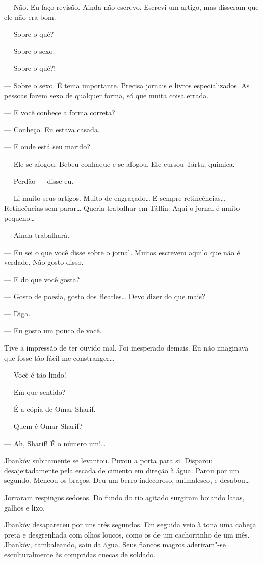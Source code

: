 --- Não. Eu faço revisão. Ainda não escrevo. Escrevi um artigo,
mas disseram que ele não era bom.

--- Sobre o quê?

--- Sobre o sexo.

--- Sobre o quê?!

--- Sobre o sexo. É tema importante. Precisa jornais e livros
especializados. As pessoas fazem sexo de qualquer forma, só que muita
coisa errada.

--- E você conhece a forma correta?

--- Conheço. Eu estava casada.

--- E onde está seu marido?

--- Ele se afogou. Bebeu conhaque e se afogou. Ele cursou Tártu,
química.

--- Perdão --- disse eu.

--- Li muito seus artigos. Muito de engraçado\ldots{} E sempre
retincências\ldots{} Retincências sem parar\ldots{} Queria trabalhar em
Tállin. Aqui o jornal é muito pequeno\ldots{}

--- Ainda trabalhará.

--- Eu sei o que você disse sobre o jornal. Muitos escrevem
aquilo que não é verdade. Não gosto disso.

--- E do que você gosta?

--- Gosto de poesia, gosto dos Beatles\ldots{} Devo dizer do que mais?

--- Diga.

--- Eu gosto um pouco de você.

Tive a impressão de ter ouvido mal. Foi inesperado demais. Eu não
imaginava que fosse tão fácil me constranger\ldots{}

--- Você é tão lindo!

--- Em que sentido?

--- É a cópia de Omar Sharif.

--- Quem é Omar Sharif?

--- Ah, Sharif! É o número um!\ldots{}

Jbankóv subitamente se levantou. Puxou a porta para si. Disparou
desajeitadamente pela escada de cimento em direção à água. Parou por um
segundo. Meneou os braços. Deu um berro indecoroso, animalesco, e
desabou\ldots{}

Jorraram respingos sedosos. Do fundo do rio agitado surgiram boiando
latas, galhos e lixo.

Jbankóv desapareceu por uns três segundos. Em seguida veio à tona uma
cabeça preta e desgrenhada com olhos loucos, como os de um cachorrinho
de um mês. Jbankóv, cambaleando, saiu da água. Seus flancos magros
aderiram"-se esculturalmente às compridas cuecas de soldado.

